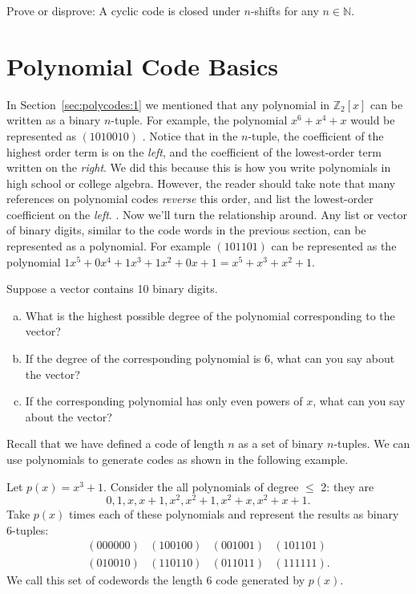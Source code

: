 \begin{exercise} {}
Prove or disprove: A cyclic code is closed under $n$-shifts for any $n \in \mathbb{N}$.
\end {exercise}

\section{Polynomial Code Basics}

In Section~\ref{sec:polycodes:1} we mentioned that  any polynomial in $\mathbb{Z}_2[x]$ can be written as a binary $n$-tuple.  For example, the polynomial $x^6 + x^4 + x$ would be represented as $(1010010)$ . Notice that in the $n$-tuple, the coefficient of the highest order term is on the \emph{left}, and the coefficient of the lowest-order term written on the \emph{right}.  We did this because this is how you write polynomials in high school or college algebra.  However, the reader should take note that many references on polynomial codes  \emph{reverse} this order, and list the lowest-order coefficient on the \emph{left}.
.
Now we'll turn the relationship around. Any list or vector of binary digits, similar to the code words in the previous section, can be represented as a polynomial. For example $(101101)$ can be represented as the polynomial $1x^5 + 0x^4 + 1x^3 + 1x^2 + 0x + 1 = x^5 + x^3 + x^2 + 1$.  

\begin{exercise}{}
Suppose a vector contains 10 binary digits.
\begin{enumerate}[(a)]
\item
 What is the highest possible degree of the polynomial corresponding to the vector?
\item
If the degree of the corresponding polynomial is 6, what can you say about the vector?
\item
If the corresponding polynomial has only even powers of $x$, what can you say about the vector?
\end{enumerate}
\end{exercise}

Recall that we have defined a code of length $n$ as a set of binary $n$-tuples.  We can use polynomials to generate codes as shown in the following example. 

\begin{example}{}
Let $p(x) = x^3 + 1$.  Consider the all polynomials of degree $\le$ 2: they are \[0, 1, x, x+1, x^2, x^2+1, x^2 + x, x^2 + x + 1.\]  Take $p(x)$ times each of these polynomials and represent the results as binary 6-tuples:
 \[ \begin{array}{cccc}
(000000) & (100100) & (001001) & (101101) \\
(010010) & (110110) & (011011) & (111111).
\end{array}\]
We call this set of codewords the length 6 code generated by $p(x)$.
\end {example}

